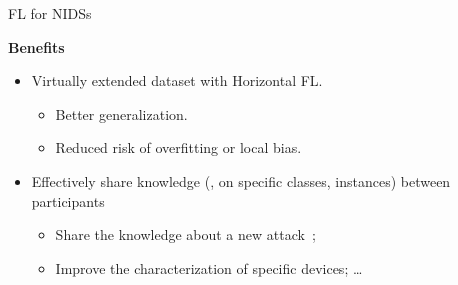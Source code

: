 \begin{frame}{FL for NIDSs}

  \textbf{Benefits}
  \begin{itemize}[<+->]
    \item Virtually extended dataset with Horizontal FL.
    \begin{itemize}[<1->]
      \item Better generalization.
      \item Reduced risk of overfitting or local bias.
    \end{itemize}
    

    \item Effectively share knowledge (\eg, on specific classes, instances) between participants
    \begin{itemize}[<1->]
      \item Share the knowledge about a new attack~\autocite{lavaur_icdcs_demo_2024};
      \item Improve the characterization of specific devices; \dots
    \end{itemize}


  \end{itemize}
\end{frame}